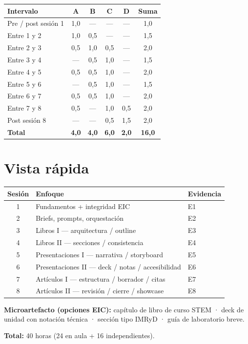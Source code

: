 \begin{tabularx}{\textwidth}{@{}Xccccc@{}}
\toprule
Intervalo & A & B & C & D & Suma \\
\midrule
Pre / post sesión 1 & 1{,}0 & --- & --- & --- & 1{,}0 \\
Entre 1 y 2 & 1{,}0 & 0{,}5 & --- & --- & 1{,}5 \\
Entre 2 y 3 & 0{,}5 & 1{,}0 & 0{,}5 & --- & 2{,}0 \\
Entre 3 y 4 & --- & 0{,}5 & 1{,}0 & --- & 1{,}5 \\
Entre 4 y 5 & 0{,}5 & 0{,}5 & 1{,}0 & --- & 2{,}0 \\
Entre 5 y 6 & --- & 0{,}5 & 1{,}0 & --- & 1{,}5 \\
Entre 6 y 7 & 0{,}5 & 0{,}5 & 1{,}0 & --- & 2{,}0 \\
Entre 7 y 8 & 0{,}5 & --- & 1{,}0 & 0{,}5 & 2{,}0 \\
Post sesión 8 & --- & --- & 0{,}5 & 1{,}5 & 2{,}0 \\
\textbf{Total} & \textbf{4{,}0} & \textbf{4{,}0} & \textbf{6{,}0} & \textbf{2{,}0} & \textbf{16{,}0} \\
\bottomrule
\end{tabularx}

\section{Vista rápida}

\begin{tabularx}{\textwidth}{@{}cXl@{}}
\toprule
Sesión & Enfoque & Evidencia \\
\midrule
1 & Fundamentos + integridad EIC & E1 \\
2 & Briefs, prompts, orquestación & E2 \\
3 & Libros I --- arquitectura / outline & E3 \\
4 & Libros II --- secciones / consistencia & E4 \\
5 & Presentaciones I --- narrativa / storyboard & E5 \\
6 & Presentaciones II --- deck / notas / accesibilidad & E6 \\
7 & Artículos I --- estructura / borrador / citas & E7 \\
8 & Artículos II --- revisión / cierre / showcase & E8 \\
\bottomrule
\end{tabularx}

\textbf{Microartefacto (opciones EIC):} capítulo de libro de curso STEM · deck de unidad con notación técnica · sección tipo IMRyD · guía de laboratorio breve.

\textbf{Total:} 40 horas (24 en aula + 16 independientes).
